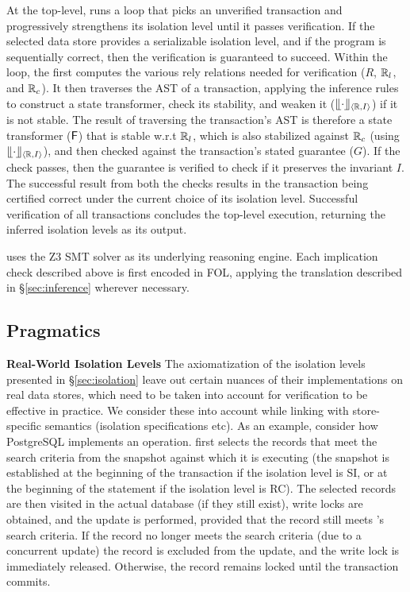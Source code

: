 At the top-level, \tool runs a loop that picks an unverified
transaction and progressively strengthens its isolation level until it
passes verification. If the selected data store provides a
serializable isolation level, and if the program is sequentially
correct, then the verification is guaranteed to succeed. Within the
loop, the \tool first computes the various rely relations needed for
verification ($R$, $\mathbb{R}_l$, and $\mathbb{R}_c$). It then traverses the AST of a
transaction, applying the inference rules to construct a state
transformer, check its stability, and weaken it ($\llfloor \cdot \rrfloor_{\langle \mathbb{R},I \rangle}$)
if it is not stable. The result of traversing the transaction's AST is
therefore a state transformer (${\sf F}$) that is stable w.r.t $\mathbb{R}_l$, which
is also stabilized against $\mathbb{R}_c$ (using $\llfloor \cdot \rrfloor_{\langle \mathbb{R},I \rangle}$), and
then checked against the transaction's stated guarantee ($G$). If the
check passes, then the guarantee is verified to check if it preserves
the invariant $I$. The successful result from both the checks results
in the transaction being certified correct under the current choice of
its isolation level. Successful verification of all transactions
concludes the top-level execution, returning the inferred isolation
levels as its output.

\tool uses the Z3 SMT solver as its underlying reasoning engine. Each
implication check described above is first encoded in FOL, applying
the translation described in \S\ref{sec:inference} wherever
necessary.

\subsection{Pragmatics}

\textbf{Real-World Isolation Levels} The axiomatization of the
isolation levels presented in \S\ref{sec:isolation} leave out
certain nuances of their implementations on real data stores, which
need to be taken into account for verification to be effective in
practice.  We consider these into account while linking \tool with
store-specific semantics (isolation specifications etc). As an
example, consider how PostgreSQL implements an  operation.
 first selects the records that meet the search criteria
from the snapshot against which it is executing (the snapshot is
established at the beginning of the transaction if the isolation level
is SI, or at the beginning of the  statement if the
isolation level is RC). The selected records are then visited in the
actual database (if they still exist), write locks are obtained, and
the update is performed, provided that the record still meets
's search criteria. If the record no longer meets the
search criteria (due to a concurrent update) the record is excluded
from the update, and the write lock is immediately released.
Otherwise, the record remains locked until the transaction commits. 

